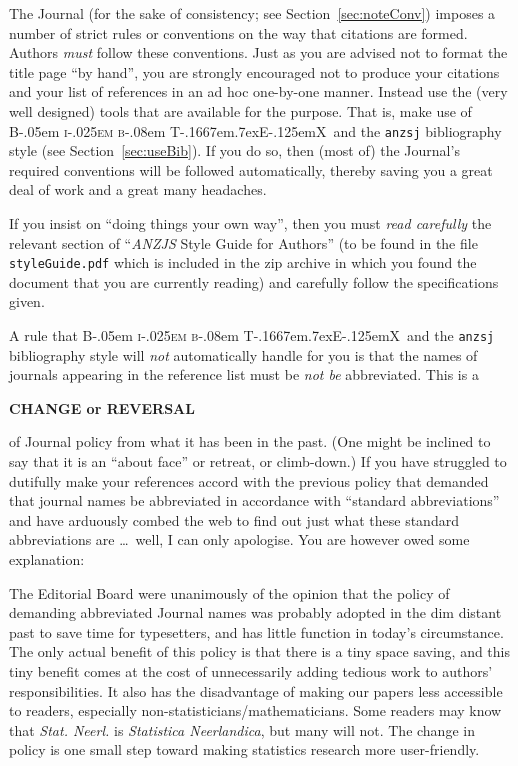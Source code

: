 \documentclass[times, doublespace]{anzsauth}
\newcommand\BibTeX{{\rmfamily B\kern-.05em \textsc{i\kern-.025em b}\kern-.08em
T\kern-.1667em\lower.7ex\hbox{E}\kern-.125emX}}
\begin{document}
The Journal (for the sake of consistency; see
Section~\ref{sec:noteConv}) imposes a number of strict rules
or conventions on the way that citations are formed.  Authors
\emph{must} follow these conventions.  Just as you are advised not
to format the title page ``by hand'', you are strongly encouraged not
to produce your citations and your list of references in an ad hoc
one-by-one manner.  Instead use the (very well designed) tools that
are available for the purpose.  That is, make use of \BibTeX\ and
the \texttt{anzsj} bibliography style (see Section~\ref{sec:useBib}).
If you do so, then (most of) the Journal's required conventions will
be followed automatically, thereby saving you a great deal of work
and a great many headaches.

If you insist on ``doing things your own way'',
then you must \emph{read carefully} the relevant section of
``\textit{ANZJS} Style Guide for Authors'' (to be found in the
file \texttt{styleGuide.pdf} which is included in the zip archive
in which you found the document that you are currently reading)
and carefully follow the specifications given.

A rule that \BibTeX\ and the \texttt{anzsj} bibliography style will
\emph{not} automatically handle for you is that the names of journals
appearing in the reference list must be \emph{not be} abbreviated.
This is a
\begin{center}
{\large \textbf{CHANGE or REVERSAL}}
\end{center}
of Journal policy from what it has been in the past. (One might
be inclined to say that it is an ``about face'' or retreat, or
climb-down.)  If you have struggled to dutifully make your references
accord with the previous policy that demanded that journal names
be abbreviated in accordance with ``standard abbreviations'' and
have arduously combed the web to find out just what these standard
abbreviations are \ldots\ well, I can only apologise.  You are however
owed some explanation:

The Editorial Board were unanimously of the opinion that
the policy of demanding abbreviated Journal names was probably
adopted in the dim distant past to save time for typesetters,
and has little function in today's circumstance.  The only actual
benefit of this policy is that there is a tiny space saving,
and this tiny benefit comes at the cost of unnecessarily adding
tedious work to authors' responsibilities.  It also has the
disadvantage of making our papers less accessible to readers,
especially non-statisticians/mathematicians. Some readers may know
that \textit{Stat. Neerl.} is \textit{Statistica Neerlandica},
but many will not.  The change in policy is one small step toward
making statistics research more user-friendly.
\end{document}
